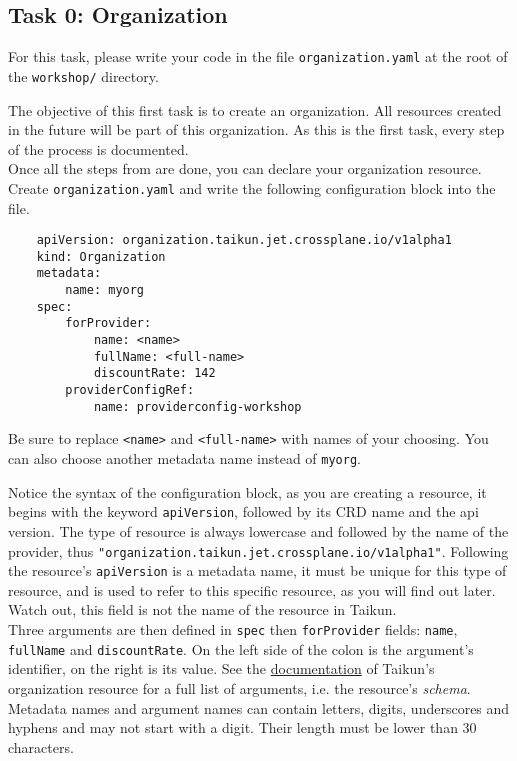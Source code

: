 \subsection{Task 0: Organization}\label{sec:organization}

\begin{note}
For this task, please write your code in the file \texttt{organization.yaml}
at the root of the \texttt{workshop/} directory.
\end{note}

The objective of this first task is to create an organization.
All resources created in the future will be part of this organization.
As this is the first task, every step of the process is documented.\\

Once all the steps from  are done, you can declare your organization resource.
Create \texttt{organization.yaml} and write the following configuration block into the file.
\begin{verbatim}
    apiVersion: organization.taikun.jet.crossplane.io/v1alpha1
    kind: Organization
    metadata:
        name: myorg
    spec:
        forProvider:
            name: <name>
            fullName: <full-name>
            discountRate: 142
        providerConfigRef:
            name: providerconfig-workshop
\end{verbatim}
Be sure to replace \texttt{<name>} and \texttt{<full-name>} with
names of your choosing.
You can also choose another metadata name instead of \texttt{myorg}.

\begin{tip}
Notice the syntax of the configuration block, as you are creating a resource,
it begins with the keyword \texttt{apiVersion}, followed by its CRD name and the api version.
The type of resource is always lowercase and followed by the name of the provider,
thus \texttt{"organization.taikun.jet.crossplane.io/v1alpha1"}.
Following the resource's \texttt{apiVersion} is a metadata name, it must be unique for this type of resource, and is used
to refer to this specific resource, as you will find out later.
Watch out, this field is not the name of the resource in Taikun.\\

Three arguments are then defined in \texttt{spec} then \texttt{forProvider} fields: \texttt{name}, \texttt{fullName} and \texttt{discountRate}.
On the left side of the colon is the argument's identifier, on the right is its value.
See the \href{https://doc.crds.dev/github.com/itera-io/provider-jet-taikun/organization.taikun.jet.crossplane.io/Organization/v1alpha1}{documentation} of Taikun's organization resource for a full list of arguments, i.e. the resource's \textit{schema}.\\

Metadata names and argument names can contain letters, digits, underscores and hyphens and may not start with a digit. Their length must be lower than 30 characters.
\end{tip}

